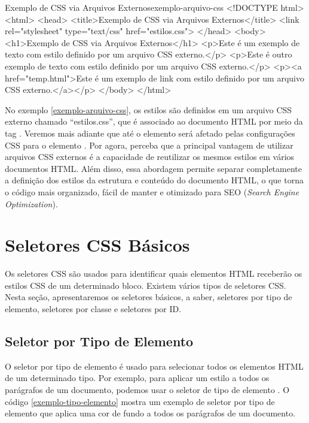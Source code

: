 \begin{htmlcode}{Exemplo de CSS via Arquivos Externos}{exemplo-arquivo-css}
<!DOCTYPE html>
<html>
<head>
    <title>Exemplo de CSS via Arquivos Externos</title>
    <link rel="stylesheet" type="text/css" href="estilos.css">
</head>
<body>
    <h1>Exemplo de CSS via Arquivos Externos</h1>
    <p>Este é um exemplo de texto com estilo definido por um 
        arquivo CSS externo.</p>
    <p>Este é outro exemplo de texto com estilo definido por um 
        arquivo CSS externo.</p>
    <p><a href="temp.html">Este é um exemplo de link com estilo definido por um 
        arquivo CSS externo.</a></p>
</body>
</html>
\end{htmlcode}

No exemplo \ref{exemplo-arquivo-css}, os estilos são definidos em um arquivo CSS externo chamado ``estilos.css'', que é associado ao documento HTML por meio da tag . Veremos mais adiante que até o elemento  será afetado pelas configurações CSS para o elemento . Por agora, perceba que a principal vantagem de utilizar arquivos CSS externos é a capacidade de reutilizar os mesmos estilos em vários documentos HTML. Além disso, essa abordagem permite separar completamente a definição dos estilos da estrutura e conteúdo do documento HTML, o que torna o código mais organizado, fácil de manter e otimizado para SEO (\textit{Search Engine Optimization}).

\section{Seletores CSS Básicos}

Os seletores CSS são usados para identificar quais elementos HTML receberão os estilos CSS de um determinado bloco. Existem vários tipos de seletores CSS. Nesta seção, apresentaremos os seletores básicos, a saber, seletores por tipo de elemento, seletores por classe e seletores por ID.

\subsection{Seletor por Tipo de Elemento}

O seletor por tipo de elemento é usado para selecionar todos os elementos HTML de um determinado tipo. Por exemplo, para aplicar um estilo a todos os parágrafos de um documento, podemos usar o seletor de tipo de elemento . O código \ref{exemplo-tipo-elemento} mostra um exemplo de seletor por tipo de elemento que aplica uma cor de fundo a todos os parágrafos de um documento.


